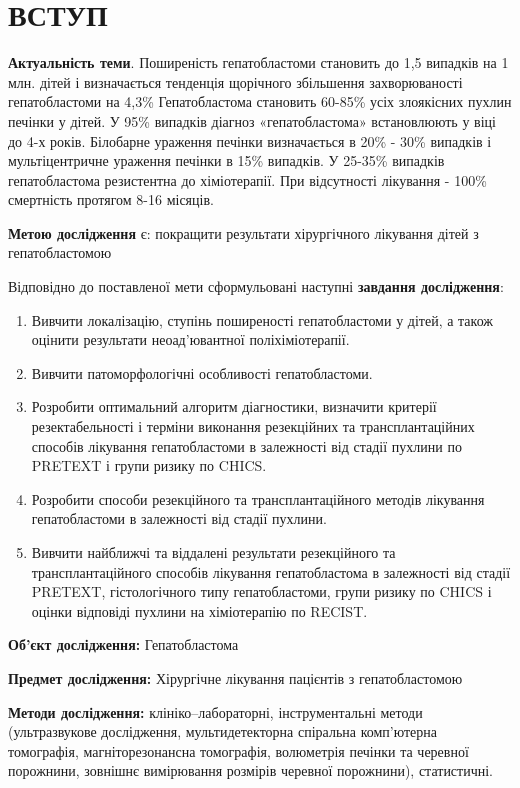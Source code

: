 \chapter{ВСТУП}
\textbf{Актуальність теми}. Поширеність гепатобластоми становить до 1,5 випадків на 1 млн. дітей і визначається тенденція щорічного збільшення захворюваності гепатобластоми на 4,3\% Гепатобластома становить 60-85\% усіх злоякісних пухлин печінки у дітей. У 95\% випадків діагноз «гепатобластома» встановлюють у віці до 4-х років. Білобарне ураження печінки визначається в 20\% - 30\% випадків і мультіцентричне ураження печінки в 15\% випадків. У 25-35\% випадків гепатобластома резистентна до хіміотерапії. При відсутності лікування - 100\% смертність протягом 8-16 місяців.

\textbf{Метою дослідження} є: покращити результати хірургічного лікування дітей з гепатобластомою

Відповідно до поставленої мети сформульовані наступні \textbf{завдання дослідження}:
\begin{enumerate}
    \item Вивчити локалізацію, ступінь поширеності гепатобластоми у дітей, а також оцінити результати неоад'ювантної поліхіміотерапії.
    \item Вивчити патоморфологічні особливості гепатобластоми.
    \item Розробити оптимальний алгоритм діагностики, визначити критерії резектабельності і терміни виконання резекційних та трансплантаційних способів лікування гепатобластоми в залежності від стадії пухлини по PRETEXT і групи ризику по CHICS.
    \item Розробити способи резекційного та трансплантаційного методів лікування гепатобластоми в залежності від стадії пухлини.
    \item Вивчити найближчі та віддалені результати резекційного та трансплантаційного способів лікування гепатобластома в залежності від стадії PRETEXT, гістологічного типу гепатобластоми, групи ризику по CHICS і оцінки відповіді пухлини на хіміотерапію по RECIST.
    
\end{enumerate}


\textbf{Об’єкт дослідження:} Гепатобластома

\textbf{Предмет дослідження:} Хірургічне лікування пацієнтів з гепатобластомою

\textbf{Методи дослідження:} клініко–лабораторні, інструментальні методи (ультразвукове дослідження, мультидетекторна спіральна комп’ютерна томографія, магніторезонансна томографія, волюметрія печінки та черевної порожнини, зовнішнє вимірювання розмірів черевної порожнини), статистичні.


